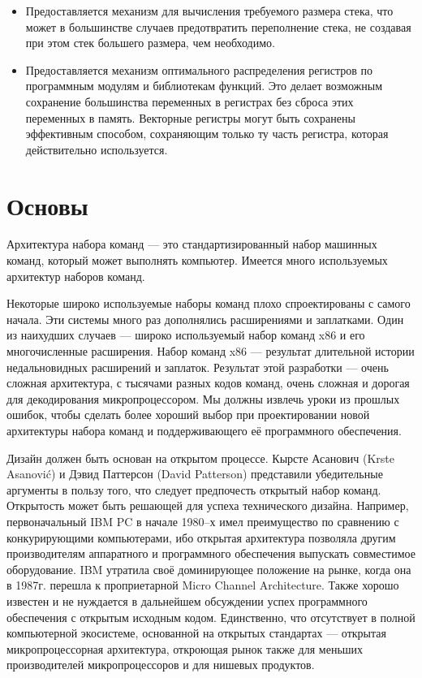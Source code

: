 \documentclass[forwardcom.tex]{subfiles}
\begin{document}
\begin{itemize}
\item Предоставляется механизм для вычисления требуемого размера стека, что может в большинстве случаев предотвратить переполнение стека, не создавая при этом стек большего размера, чем необходимо.

\item Предоставляется механизм оптимального распределения регистров по программным модулям и библиотекам функций. Это делает возможным сохранение большинства переменных в регистрах без сброса этих переменных в память. Векторные регистры могут быть сохранены эффективным способом, сохраняющим только ту часть регистра, которая действительно используется.
\end{itemize}

\section{Основы}
Архитектура набора команд --- это стандартизированный набор машинных команд, который может выполнять компьютер. Имеется много используемых архитектур наборов команд.

Некоторые широко используемые наборы команд плохо спроектированы с самого начала. Эти системы много раз дополнялись расширениями и заплатками. Один из 
наихудших случаев --- широко используемый набор команд x86 и его многочисленные расширения. Набор команд x86 --- результат длительной истории недальновидных расширений и заплаток. Результат этой разработки --- очень сложная архитектура, с тысячами разных кодов команд, очень сложная и дорогая для
декодирования микропроцессором. Мы должны извлечь уроки из прошлых ошибок, чтобы сделать более хороший выбор при проектировании новой архитектуры набора
команд и поддерживающего её программного обеспечения.

Дизайн должен быть основан на открытом процессе. Кырсте Асанович (Krste Asanović) и Дэвид Паттерсон (David Patterson) представили убедительные аргументы в пользу того, что следует предпочесть открытый набор команд. Открытость может быть решающей для успеха технического дизайна. Например, первоначальный IBM PC в начале 1980--х имел преимущество по сравнению с конкурирующими компьютерами, ибо открытая архитектура позволяла другим производителям аппаратного и программного обеспечения выпускать совместимое оборудование. IBM утратила своё доминирующее положение на рынке, когда она в 1987г. перешла к проприетарной Micro Channel Architecture. Также хорошо известен и не нуждается в дальнейшем обсуждении успех программного обеспечения с открытым исходным кодом. Единственно, что отсутствует в полной компьютерной экосистеме, основанной на открытых стандартах --- открытая микропроцессорная архитектура, откроющая рынок также для меньших производителей микропроцессоров и для нишевых продуктов.
\end{document}
